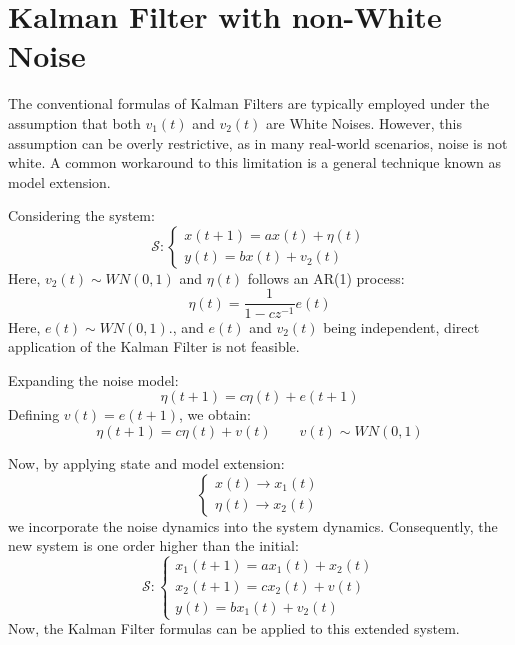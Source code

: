 \section{Kalman Filter with non-White Noise}

The conventional formulas of Kalman Filters are typically employed under the assumption that both $v_1(t)$ and $v_2(t)$ are White Noises. 
However, this assumption can be overly restrictive, as in many real-world scenarios, noise is not white.
A common workaround to this limitation is a general technique known as model extension.
\begin{example}
    Considering the system:
    \[\mathcal{S}:\begin{cases}
        x(t+1)=ax(t)+\eta(t) \\
        y(t)=bx(t)+v_2(t)
    \end{cases}\]
    Here, $v_2(t)\sim WN(0,1)$ and $\eta(t)$ follows an AR(1) process:
    \[\eta(t)=\dfrac{1}{1-cz^{-1}}e(t)\]
    Here, $e(t)\sim WN(0,1)$., and $e(t)$ and $v_2(t)$ being independent, direct application of the Kalman Filter is not feasible.

    Expanding the noise model:
    \[\eta(t+1)=c\eta(t)+e(t+1)\]
    Defining $v(t)=e(t+1)$, we obtain:
    \[\eta(t+1)=c\eta(t)+v(t) \qquad v(t)\sim WN(0,1)\]

    Now, by applying state and model extension:
    \[\begin{cases}
        x(t) \rightarrow x_1(t) \\
        \eta(t) \rightarrow x_2(t)
    \end{cases}\]
    we incorporate the noise dynamics into the system dynamics. 
    Consequently, the new system is one order higher than the initial:
    \[\mathcal{S}:\begin{cases}
        x_1(t+1)=ax_1(t)+x_2(t) \\
        x_2(t+1)=cx_2(t)+v(t) \\
        y(t)=bx_1(t)+v_2(t)
    \end{cases}\]
    Now, the Kalman Filter formulas can be applied to this extended system.
\end{example}
